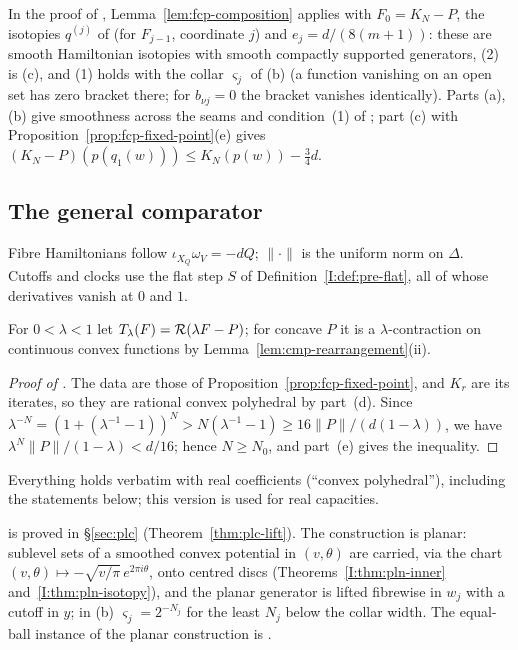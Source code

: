 In the proof of , Lemma~\ref{lem:fcp-composition} applies with $F_0=K_N-P$, the isotopies $q^{(j)}$ of  (for $F_{j-1}$, coordinate $j$) and $e_j=d/(8(m+1))$: these are smooth Hamiltonian isotopies with smooth compactly supported generators, (2) is (c), and (1) holds with the collar $\varsigma_j$ of (b) (a function vanishing on an open set has zero bracket there; for $b_{\nu j}=0$ the bracket vanishes identically). Parts (a),(b) give smoothness across the seams and condition~(1) of ; part (c) with Proposition~\ref{prop:fcp-fixed-point}(e) gives $(K_N-P)(p(q_1(w)))\le K_N(p(w))-\frac34d$.

\subsection{The general comparator}\label{sec:fcp-general}

Fibre Hamiltonians follow $\iota_{X_Q}\omega_V=-dQ$; $\|\cdot\|$ is the uniform norm on $\Delta$. Cutoffs and clocks
use the flat step $S$ of Definition~\ref{I:def:pre-flat}, all of whose derivatives vanish at $0$ and $1$.

For $0<\lambda<1$ let $T_\lambda(F)=\mathcal{R}(\lambda F-P)$; for concave $P$ it is a $\lambda$-contraction on continuous
convex functions by Lemma~\ref{lem:cmp-rearrangement}(ii).

\begin{proof}[Proof of ]
The data are those of Proposition~\ref{prop:fcp-fixed-point}, and $K_r$ are its iterates, so they are rational convex
polyhedral by part~(d). Since $\lambda^{-N}=(1+(\lambda^{-1}-1))^N>N(\lambda^{-1}-1)\ge16\|P\|/(d(1-\lambda))$, we have
$\lambda^N\|P\|/(1-\lambda)<d/16$; hence $N\ge N_0$, and part~(e) gives the inequality.
\end{proof}

Everything holds verbatim with real coefficients (``convex polyhedral''), including the statements below; this
version is used for real capacities.

 is proved in \S\ref{sec:plc} (Theorem~\ref{thm:plc-lift}). The construction is planar: sublevel sets of a smoothed convex potential in
$(v,\theta)$ are carried, via the chart $(v,\theta)\mapsto-\sqrt{v/\pi}\,e^{2\pi i\theta}$, onto centred discs
(Theorems~\ref{I:thm:pln-inner} and~\ref{I:thm:pln-isotopy}), and the planar generator is lifted fibrewise in $w_j$
with a cutoff in $y$; in (b) $\varsigma_j=2^{-N_j}$ for the least $N_j$ below the collar width. The equal-ball
instance of the planar construction is .

